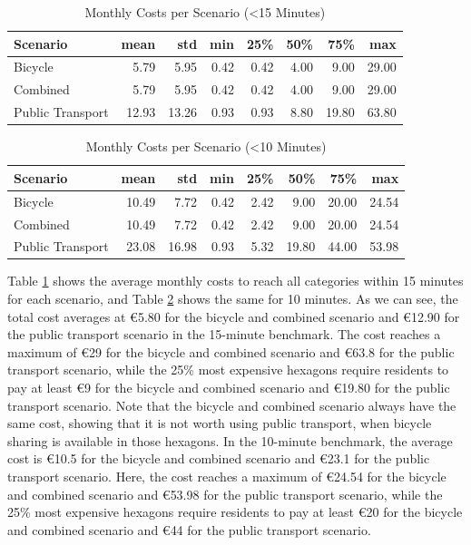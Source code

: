 \begin{table}
  \caption{Monthly Costs per Scenario (<15 Minutes)}
  \label{tab:monthly_costs_per_scenario_15}
  \begin{center}
    \begin{tabular}{|l|r|r|r|r|r|r|r|}
    \hline
    Scenario & mean & std & min & 25\% & 50\% & 75\% & max \\
    \hline
    Bicycle & 5.79 & 5.95 & 0.42 & 0.42 & 4.00 & 9.00 & 29.00 \\
    \hline
    Combined & 5.79 & 5.95 & 0.42 & 0.42 & 4.00 & 9.00 & 29.00 \\
    \hline
    Public Transport & 12.93 & 13.26 & 0.93 & 0.93 & 8.80 & 19.80 & 63.80 \\
    \hline
    \end{tabular}
  \end{center}
\end{table}


\begin{table}
  \caption{Monthly Costs per Scenario (<10 Minutes)}
  \label{tab:monthly_costs_per_scenario_10}
  \begin{center}
    \begin{tabular}{|l|r|r|r|r|r|r|r|}
    \hline
    Scenario & mean & std & min & 25\% & 50\% & 75\% & max \\
    \hline
    Bicycle & 10.49 & 7.72 & 0.42 & 2.42 & 9.00 & 20.00 & 24.54 \\
    \hline
    Combined & 10.49 & 7.72 & 0.42 & 2.42 & 9.00 & 20.00 & 24.54 \\
    \hline
    Public Transport & 23.08 & 16.98 & 0.93 & 5.32 & 19.80 & 44.00 & 53.98 \\
    \hline
    \end{tabular}
  \end{center}
\end{table}

Table \ref{tab:monthly_costs_per_scenario_15} shows the average monthly costs to reach all categories within 15 minutes for each scenario, and Table \ref{tab:monthly_costs_per_scenario_10} shows the same for 10 minutes.
As we can see, the total cost averages at \euro{5.80} for the bicycle and combined scenario and \euro{12.90} for the public transport scenario in the 15-minute benchmark.
The cost reaches a maximum of \euro{29} for the bicycle and combined scenario and \euro{63.8} for the public transport scenario, while the 25\% most expensive hexagons require residents to pay at least \euro{9} for the bicycle and combined scenario and \euro{19.80} for the public transport scenario.
Note that the bicycle and combined scenario always have the same cost, showing that it is not worth using public transport, when bicycle sharing is available in those hexagons.
In the 10-minute benchmark, the average cost is \euro{10.5} for the bicycle and combined scenario and \euro{23.1} for the public transport scenario.
Here, the cost reaches a maximum of \euro{24.54} for the bicycle and combined scenario and \euro{53.98} for the public transport scenario, while the 25\% most expensive hexagons require residents to pay at least \euro{20} for the bicycle and combined scenario and \euro{44} for the public transport scenario.

